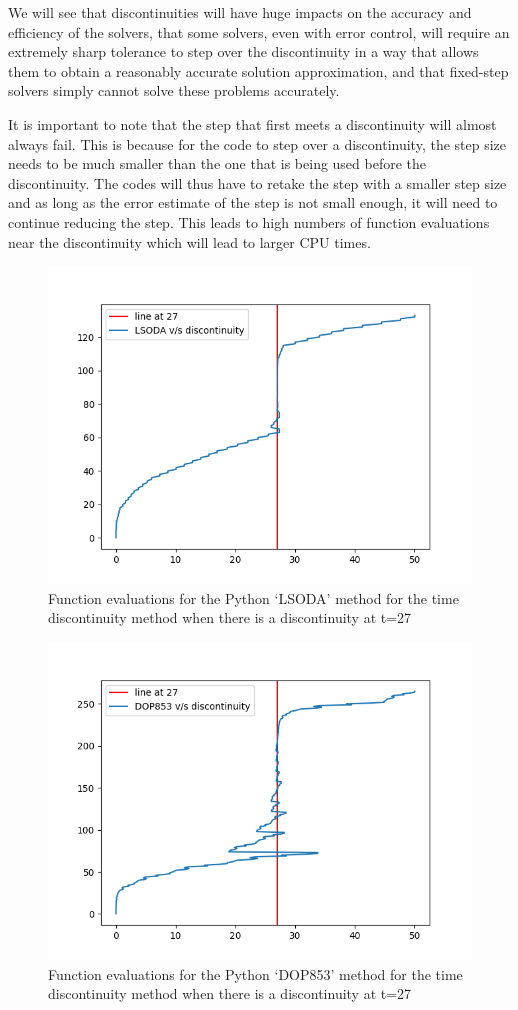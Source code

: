 We will see that discontinuities will have huge impacts on the accuracy and efficiency of the solvers, that some solvers, even with error control, will require an extremely sharp tolerance to step over the discontinuity in a way that allows them to obtain a reasonably accurate solution approximation, and that fixed-step solvers simply cannot solve these problems accurately. 

It is important to note that the step that first meets a discontinuity will almost always fail. This is because for the code to step over a discontinuity, the step size needs to be much smaller than the one that is being used before the discontinuity. The codes will thus have to retake the step with a smaller step size and as long as the error estimate of the step is not small enough, it will need to continue reducing the step. This leads to high numbers of function evaluations near the discontinuity which will lead to larger CPU times. 

\begin{figure}[h]
\centering
\includegraphics[width=0.7\linewidth]{./figures/lsoda_vs_discontinuity}
\caption{Function evaluations for the Python `LSODA' method for the time discontinuity method when there is a discontinuity at t=27}
\label{fig:lsoda_vs_discontinuity}
\end{figure}

\begin{figure}[h]
\centering
\includegraphics[width=0.7\linewidth]{./figures/dop853_vs_discontinuity}
\caption{Function evaluations for the Python `DOP853' method for the time discontinuity method when there is a discontinuity at t=27}
\label{fig:dop853_vs_discontinuity}
\end{figure}

